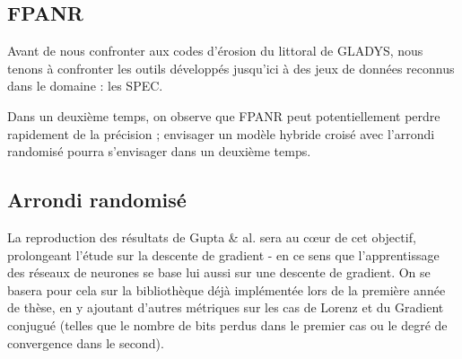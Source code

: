 \documentclass[a4paper,11pt]{article}
\begin{document}
\subsection{FPANR}
Avant de nous confronter aux codes d'érosion du littoral de GLADYS, nous tenons à confronter les outils développés jusqu'ici à des jeux de données reconnus dans le domaine : les SPEC.

Dans un deuxième temps, on observe que FPANR peut potentiellement perdre rapidement de la précision ; envisager un modèle hybride croisé avec l'arrondi randomisé pourra s'envisager dans un deuxième temps.

\subsection{Arrondi randomisé}
La reproduction des résultats de Gupta \& al.\cite{gupta2015deep} sera au cœur de cet objectif, prolongeant l'étude sur la descente de gradient - en ce sens que l'apprentissage des réseaux de neurones se base lui aussi sur une descente de gradient. On se basera pour cela sur la bibliothèque déjà implémentée lors de la première année de thèse, en y ajoutant d'autres métriques sur les cas de Lorenz et du Gradient conjugué (telles que le nombre de bits perdus dans le premier cas ou le degré de convergence dans le second).
\end{document}
